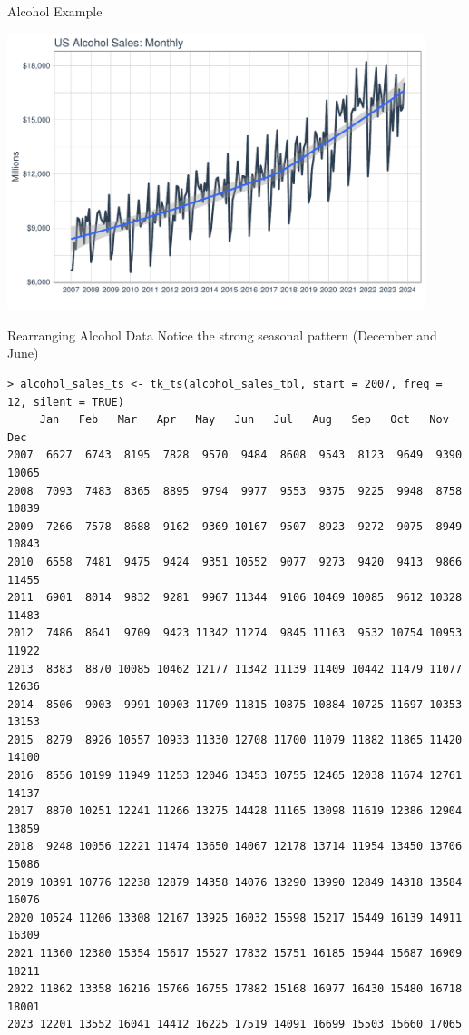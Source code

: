 \begin{frame}{Alcohol Example}
\begin{center}
\includegraphics[width=4.8in]{./resources/alcohol.pdf}
\end{center}
\end{frame}


\begin{frame}[fragile]{Rearranging Alcohol Data}
Notice the strong seasonal pattern (December and June)
\scriptsize
\begin{verbatim}
> alcohol_sales_ts <- tk_ts(alcohol_sales_tbl, start = 2007, freq = 12, silent = TRUE)
     Jan   Feb   Mar   Apr   May   Jun   Jul   Aug   Sep   Oct   Nov   Dec
2007  6627  6743  8195  7828  9570  9484  8608  9543  8123  9649  9390 10065
2008  7093  7483  8365  8895  9794  9977  9553  9375  9225  9948  8758 10839
2009  7266  7578  8688  9162  9369 10167  9507  8923  9272  9075  8949 10843
2010  6558  7481  9475  9424  9351 10552  9077  9273  9420  9413  9866 11455
2011  6901  8014  9832  9281  9967 11344  9106 10469 10085  9612 10328 11483
2012  7486  8641  9709  9423 11342 11274  9845 11163  9532 10754 10953 11922
2013  8383  8870 10085 10462 12177 11342 11139 11409 10442 11479 11077 12636
2014  8506  9003  9991 10903 11709 11815 10875 10884 10725 11697 10353 13153
2015  8279  8926 10557 10933 11330 12708 11700 11079 11882 11865 11420 14100
2016  8556 10199 11949 11253 12046 13453 10755 12465 12038 11674 12761 14137
2017  8870 10251 12241 11266 13275 14428 11165 13098 11619 12386 12904 13859
2018  9248 10056 12221 11474 13650 14067 12178 13714 11954 13450 13706 15086
2019 10391 10776 12238 12879 14358 14076 13290 13990 12849 14318 13584 16076
2020 10524 11206 13308 12167 13925 16032 15598 15217 15449 16139 14911 16309
2021 11360 12380 15354 15617 15527 17832 15751 16185 15944 15687 16909 18211
2022 11862 13358 16216 15766 16755 17882 15168 16977 16430 15480 16718 18001
2023 12201 13552 16041 14412 16225 17519 14091 16699 15503 15660 17065      
\end{verbatim}
\end{frame}

